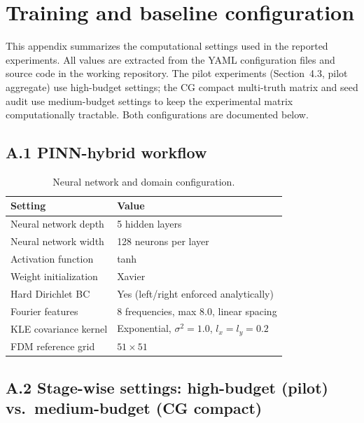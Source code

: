 \documentclass[pdflatex,sn-mathphys,Numbered,iicol]{sn-jnl}
\begin{document}
\appendix
\section{Training and baseline configuration}
\label{sec:appendix-config}

This appendix summarizes the computational settings used in the reported
experiments. All values are extracted from the YAML configuration files and
source code in the working repository. The pilot experiments (Section~4.3,
pilot aggregate) use high-budget settings; the CG compact multi-truth matrix
and seed audit use medium-budget settings to keep the experimental matrix
computationally tractable. Both configurations are documented below.

\subsection*{A.1 PINN-hybrid workflow}

\begin{table}[!ht]
  \caption{Neural network and domain configuration.}
  \label{tab:config-nn}
  \centering\small
  \setlength{\tabcolsep}{3pt}
  \begin{tabular}{@{}p{}p{}@{}}
    \toprule
    Setting & Value \\
    \midrule
    Neural network depth & 5 hidden layers \\
    Neural network width & 128 neurons per layer \\
    Activation function & tanh \\
    Weight initialization & Xavier \\
    Hard Dirichlet BC & Yes (left/right enforced analytically) \\
    Fourier features & 8 frequencies, max 8.0, linear spacing \\
    KLE covariance kernel & Exponential, $\sigma^2\!=\!1.0$, $l_x\!=\!l_y\!=\!0.2$ \\
    FDM reference grid & $51 \times 51$ \\
    \bottomrule
  \end{tabular}
\end{table}

\subsection*{A.2 Stage-wise settings: high-budget (pilot) vs.\ medium-budget (CG compact)}
\end{document}
